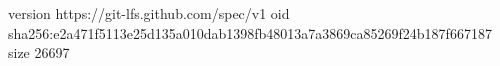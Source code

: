 version https://git-lfs.github.com/spec/v1
oid sha256:e2a471f5113e25d135a010dab1398fb48013a7a3869ca85269f24b187f667187
size 26697
